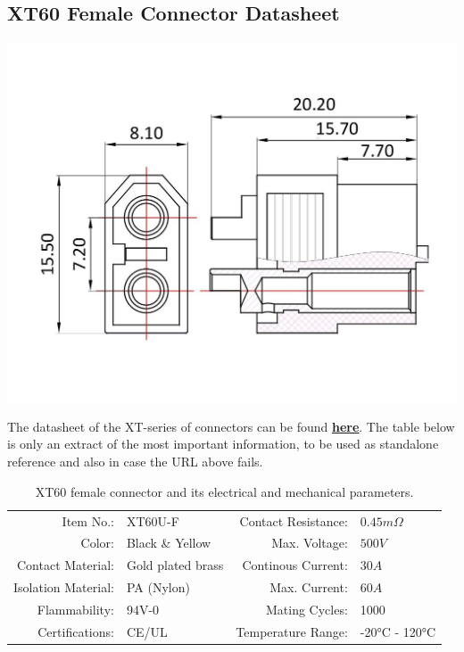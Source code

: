 \clearpage %

\subsection{XT60 Female Connector Datasheet}

\includegraphics[width=\textwidth]{contents/figures/xt60_f.jpg}

The datasheet of the XT-series of connectors can be found \href{https://www.lcsc.com/datasheet/lcsc_datasheet_2401031338_Changzhou-Amass-Elec-XT60U-F_C19191801.pdf}{\textbf{\underline{here}}}.
The table below is only an extract of the most important information, to be used as standalone reference and also in case the URL above fails.

\begin{table}[h] %
    \begin{tabular}{rlrl}
         Item No.:&  XT60U-F &  Contact Resistance:& $0.45m \Omega$\\
         Color:&  Black \& Yellow&  Max. Voltage:& $500V$\\
         Contact Material:&  Gold plated brass&  Continous Current:& $30A$\\
         Isolation Material:&  PA (Nylon)&  Max. Current:& $60A$\\
         Flammability:&  94V-0&  Mating Cycles:& 1000\\
         Certifications:&  CE/UL&  Temperature Range:& -20°C - 120°C\\
    \end{tabular}
    \caption{XT60 female connector and its electrical and mechanical parameters.}
    \label{xt60_f_specs}
\end{table}

